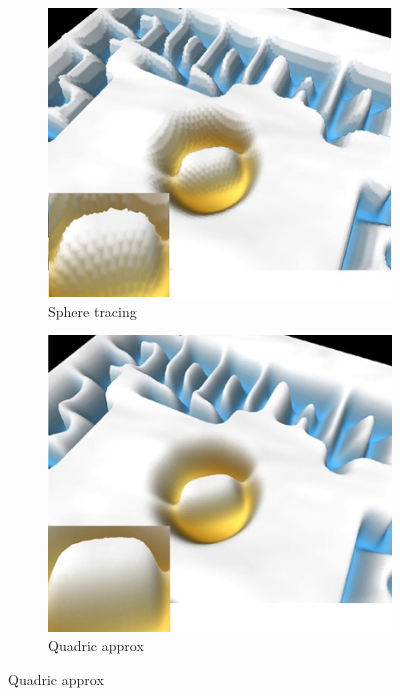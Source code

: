 \begin{figure}
\begin{fullwidth}
	\begin{subfigure}[b]{0.18\thewidth}
		\includegraphics[width=\textwidth]{graphics/df/ddm-shpere-tracing}	
		\caption{Sphere tracing}
	\end{subfigure}
	\begin{subfigure}[b]{0.1758\thewidth}
		\includegraphics[width=\textwidth]{graphics/df/ddm-quadric-approx}	
		\caption{Quadric approx}

\end{subfigure}
\end{fullwidth}
\end{figure}
